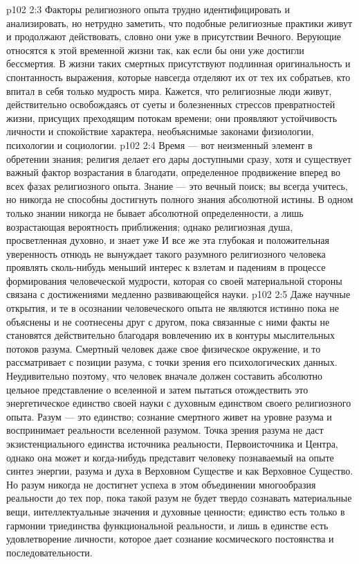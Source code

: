\vs p102 2:3 Факторы религиозного опыта трудно идентифицировать и анализировать, но нетрудно заметить, что подобные религиозные практики живут и продолжают действовать, словно они уже в присутствии Вечного. Верующие относятся к этой временной жизни так, как если бы они уже достигли бессмертия. В жизни таких смертных присутствуют подлинная оригинальность и спонтанность выражения, которые навсегда отделяют их от тех их собратьев, кто впитал в себя только мудрость мира. Кажется, что религиозные люди живут, действительно освобождаясь от суеты и болезненных стрессов превратностей жизни, присущих преходящим потокам времени; они проявляют устойчивость личности и спокойствие характера, необъяснимые законами физиологии, психологии и социологии.
\vs p102 2:4 \pc Время --- вот неизменный элемент в обретении знания; религия делает его дары доступными сразу, хотя и существует важный фактор возрастания в благодати, определенное продвижение вперед во всех фазах религиозного опыта. Знание --- это вечный поиск; вы всегда учитесь, но никогда не способны достигнуть полного знания абсолютной истины. В одном только знании никогда не бывает абсолютной определенности, а лишь возрастающая вероятность приближения; однако религиозная душа, просветленная духовно,  и знает уже  И все же эта глубокая и положительная уверенность отнюдь не вынуждает такого разумного религиозного человека проявлять сколь\hyp{}нибудь меньший интерес к взлетам и падениям в процессе формирования человеческой мудрости, которая со своей материальной стороны связана с достижениями медленно развивающейся науки.
\vs p102 2:5 Даже научные открытия, и те в осознании человеческого опыта не являются истинно  пока не объяснены и не соотнесены друг с другом, пока связанные с ними факты не становятся действительно  благодаря вовлечению их в контуры мыслительных потоков разума. Смертный человек даже свое физическое окружение, и то рассматривает с позиции разума, с точки зрения его психологических данных. Неудивительно поэтому, что человек вначале должен составить абсолютно цельное представление о вселенной и затем пытаться отождествить это энергетическое единство своей науки с духовным единством своего религиозного опыта. Разум --- это единство; сознание смертного живет на уровне разума и воспринимает реальности вселенной разумом. Точка зрения разума не даст экзистенциального единства источника реальности, Первоисточника и Центра, однако она может и когда\hyp{}нибудь представит человеку познаваемый на опыте синтез энергии, разума и духа в Верховном Существе и как Верховное Существо. Но разум никогда не достигнет успеха в этом объединении многообразия реальности до тех пор, пока такой разум не будет твердо сознавать материальные вещи, интеллектуальные значения и духовные ценности; единство есть только в гармонии триединства функциональной реальности, и лишь в единстве есть удовлетворение личности, которое дает сознание космического постоянства и последовательности.
